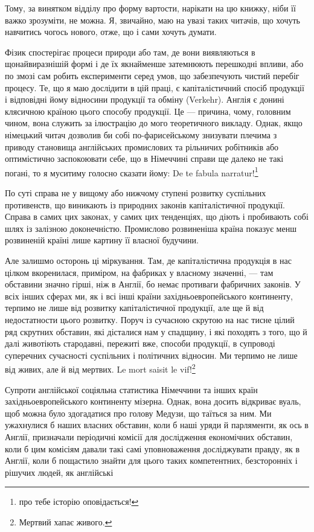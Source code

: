 
Тому, за винятком відділу про форму вартости, нарікати на цю
книжку, ніби її важко зрозуміти, не можна. Я, звичайно, маю
на увазі таких читачів, що хочуть навчитись чогось нового, отже,
що і сами хочуть думати.

Фізик спостерігає процеси природи або там, де вони виявляються
в щонайвиразнішій формі і де їх якнайменше затемнюють
перешкодні впливи, або по змозі сам робить експерименти серед
умов, що забезпечують чистий перебіг процесу. Те, що я маю
дослідити в цій праці, є капіталістичний спосіб продукції і відповідні
йому відносини продукції та обміну (Verkehr). Англія
є донині клясичною країною цього способу продукції. Це —
причина, чому, головним чином, вона служить за ілюстрацію
до мого теоретичного викладу. Однак, якщо німецький читач
дозволив би собі по-фарисейському знизувати плечима з приводу
становища англійських промислових та рільничих робітників або
оптимістично заспокоювати себе, що в Німеччині справи ще далеко
не такі погані, то я муситиму голосно сказати йому: De
te fabula narratur!\footnote*{
про тебе історію оповідається! 
}

По суті справа не у вищому або нижчому ступені розвитку
суспільних противенств, що виникають із природних законів капіталістичної
продукції. Справа в самих цих законах, у самих цих
тенденціях, що діють і пробивають собі шлях із залізною доконечністю.
Промислово розвиненіша країна показує менш розвиненій
країні лише картину її власної будучини.

Але залишмо осторонь ці міркування. Там, де капіталістична
продукція в нас цілком вкоренилася, приміром, на фабриках
у власному значенні, — там обставини значно гірші, ніж в Англії,
бо немає противаги фабричних законів. У всіх інших сферах ми,
як і всі інші країни західньоевропейського континенту, терпимо
не лише від розвитку капіталістичної продукції, але ще й від
недостатности цього розвитку. Поруч із сучасною скрутою на
нас тисне цілий ряд скрутних обставин, які дісталися нам у
спадщину, і які походять з того, що й далі животіють стародавні,
пережиті вже, способи продукції, в супроводі суперечних
сучасності суспільних і політичних відносин. Ми терпимо
не лише від живих, але й від мертвих. Le mort saisit le vif!\footnote*{
Мертвий хапає живого. 
}

Супроти англійської соціяльна статистика Німеччини та інших
країн західньоевропейського континенту мізерна. Однак, вона
досить відкриває вуаль, щоб можна було здогадатися про голову
Медузи, що таїться за ним. Ми ужахнулися б наших власних
обставин, коли б наші уряди й парляменти, як ось в Англії, призначали
періодичні комісії для дослідження економічних обставин,
коли б цим комісіям давали такі самі уповноваження досліджувати
правду, як в Англії, коли б пощастило знайти для цього
таких компетентних, безсторонніх і рішучих людей, як англійські
\parbreak{}  %
